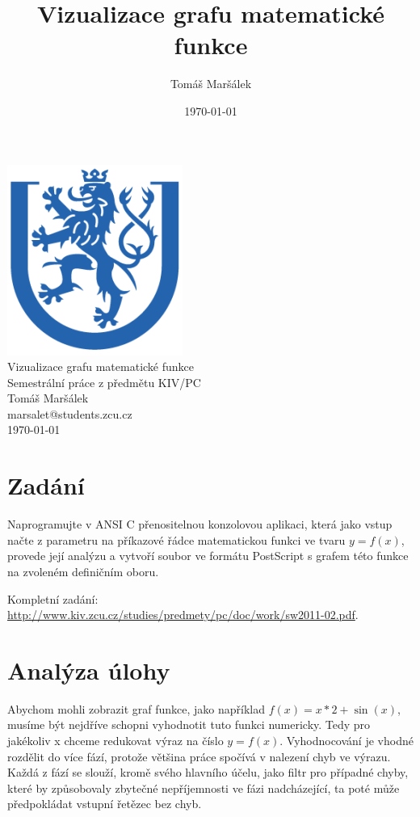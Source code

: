 \documentclass[11pt]{article}
\title{Vizualizace grafu matematické funkce}
\author{Tomáš Maršálek}
\date{\today}
\begin{document}
\begin{titlepage}
\begin{center}
	\includegraphics{res/znak_vzor.png} \\[2cm]
	\huge{Vizualizace grafu matematické funkce} \\[.2cm]
	\Large{Semestrální práce z předmětu KIV/PC} \\[2cm]
	\Large{Tomáš Maršálek} \\
	\large{marsalet@students.zcu.cz} \\[1cm]
	\normalsize{\today}
\end{center}
\end{titlepage}

\section{Zadání}
Naprogramujte v ANSI C přenositelnou konzolovou aplikaci, která jako vstup
načte z parametru na příkazové řádce matematickou funkci ve tvaru $y = f(x)$,
provede její analýzu a vytvoří soubor ve formátu PostScript s grafem této
funkce na zvoleném definičním oboru.

Kompletní zadání:
\url{http://www.kiv.zcu.cz/studies/predmety/pc/doc/work/sw2011-02.pdf}.

\section{Analýza úlohy}
Abychom mohli zobrazit graf funkce, jako například $f(x) = x * 2 + \sin(x)$,
musíme být nejdříve schopni vyhodnotit tuto funkci numericky. Tedy pro
jakékoliv x chceme redukovat výraz na číslo $y = f(x)$. Vyhodnocování je vhodné
rozdělit do více fází, protože většina práce spočívá v nalezení chyb ve výrazu.
Každá z fází se slouží, kromě svého hlavního účelu, jako filtr pro případné
chyby, které by způsobovaly zbytečné nepříjemnosti ve fázi nadcházející, ta
poté může předpokládat vstupní řetězec bez chyb. 
\end{document}
